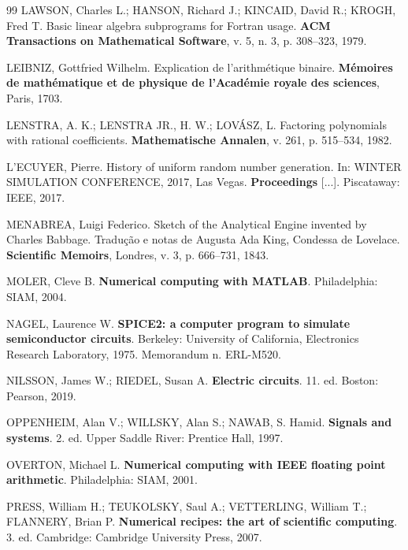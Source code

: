 \begin{thebibliography}{99}
LAWSON, Charles L.; HANSON, Richard J.; KINCAID, David R.; KROGH, Fred T. Basic linear algebra subprograms for Fortran usage. \textbf{ACM Transactions on Mathematical Software}, v. 5, n. 3, p. 308--323, 1979.

LEIBNIZ, Gottfried Wilhelm. Explication de l'arithmétique binaire. \textbf{Mémoires de mathématique et de physique de l'Académie royale des sciences}, Paris, 1703.

LENSTRA, A. K.; LENSTRA JR., H. W.; LOVÁSZ, L. Factoring polynomials with rational coefficients. \textbf{Mathematische Annalen}, v. 261, p. 515--534, 1982.

L'ECUYER, Pierre. History of uniform random number generation. In: WINTER SIMULATION CONFERENCE, 2017, Las Vegas. \textbf{Proceedings} [...]. Piscataway: IEEE, 2017.

MENABREA, Luigi Federico. Sketch of the Analytical Engine invented by Charles Babbage. Tradução e notas de Augusta Ada King, Condessa de Lovelace. \textbf{Scientific Memoirs}, Londres, v. 3, p. 666--731, 1843.

MOLER, Cleve B. \textbf{Numerical computing with MATLAB}. Philadelphia: SIAM, 2004.

NAGEL, Laurence W. \textbf{SPICE2: a computer program to simulate semiconductor circuits}. Berkeley: University of California, Electronics Research Laboratory, 1975. Memorandum n. ERL-M520.

NILSSON, James W.; RIEDEL, Susan A. \textbf{Electric circuits}. 11. ed. Boston: Pearson, 2019.

OPPENHEIM, Alan V.; WILLSKY, Alan S.; NAWAB, S. Hamid. \textbf{Signals and systems}. 2. ed. Upper Saddle River: Prentice Hall, 1997.

OVERTON, Michael L. \textbf{Numerical computing with IEEE floating point arithmetic}. Philadelphia: SIAM, 2001.

PRESS, William H.; TEUKOLSKY, Saul A.; VETTERLING, William T.; FLANNERY, Brian P. \textbf{Numerical recipes: the art of scientific computing}. 3. ed. Cambridge: Cambridge University Press, 2007.


\end{thebibliography}
